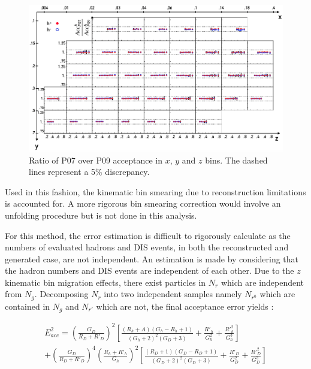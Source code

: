 \begin{figure}
  \centering
	\includegraphics[scale=0.6]{./gfx/SysAcc.png}
	\caption{Ratio of P07 over P09 acceptance in $x$, $y$ and $z$ bins. The dashed lines represent a 5\% discrepancy.}
	\label{pic:AccPer}
\end{figure}

Used in this fashion, the kinematic bin smearing due to reconstruction limitations is accounted for. A more rigorous bin smearing correction would involve an unfolding procedure but is not done in this analysis.

For this method, the error estimation is difficult to rigorously calculate as the numbers of evaluated hadrons and DIS events, in both the reconstructed and generated case, are not independent. An estimation is made by considering that the hadron numbers and DIS events are independent of each other. Due to the $z$ kinematic bin migration effects, there exist particles in $N_r$ which are independent from $N_g$. Decomposing $N_r$ into two independent samples namely $N_{r^0}$ which are contained in $N_g$ and $N_{r'}$ which are not, the final acceptance error yields :

\begin{equation}
  \begin{split}
    E^2_{acc} = \left (\frac{G_D}{R_D+R'_{D}}\right )^2\left [\frac{(R_h+A)(G_h-R_h+1)}{(G_h+2)^2(G_D+3)}+\frac{R'_{h}}{G^2_h}+\frac{R'^2_h}{G^3_h}\right ] \\
                + \left (\frac{G_D}{R_D+R'_{D}}\right )^4\left (\frac{R_h+R'_h}{G_h}\right )^2\left [\frac{(R_D+1)(G_D-R_D+1)}{(G_D+2)^2(G_D+3)}+\frac{R'_D}{G^2_D}+\frac{R'^2_D}{G^3_D}\right ]
  \end{split}
\end{equation}

